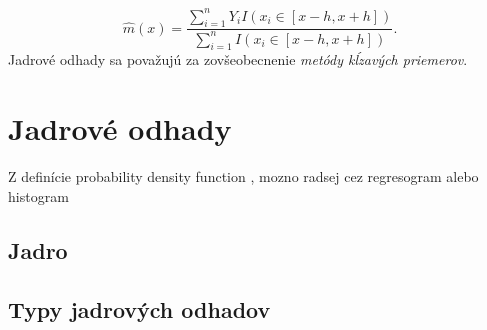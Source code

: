 \begin{equation}
\hat{m}(x) = \dfrac{\sum\limits_{i=1}^{n}  Y_i I (x_i  \in  [x - h, x + h])}{\sum\limits_{i=1}^{n} I(x_i  \in  [x - h, x + h])}.
\end{equation}
Jadrové odhady sa považujú za zovšeobecnenie \textit{metódy kĺzavých priemerov}.


 \section{Jadrové odhady}
 Z definície probability density function , mozno radsej cez regresogram alebo histogram 
 \subsection{Jadro}
 
\subsection{Typy jadrových odhadov}